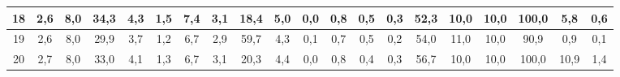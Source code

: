 \begin{sidewaystable}[]
\begin{tabular}{|c|c|c|c|c|c|c|c|c|c|c|c|c|c|c|c|c|c|c|c|}
    18 & 2,6                                              & 8,0                                              & 34,3                                             & 4,3                                              & 1,5                                              & 7,4                                              & 3,1                                              & 18,4                                             & 5,0                                              & 0,0                                              & 0,8                                              & 0,5                                              & 0,3                                              & 52,3                                            & 10,0                                            & 10,0                                            & 100,0                                           & 5,8                                             & 0,6                                             \\ \hline
    19 & 2,6                                              & 8,0                                              & 29,9                                             & 3,7                                              & 1,2                                              & 6,7                                              & 2,9                                              & 59,7                                             & 4,3                                              & 0,1                                              & 0,7                                              & 0,5                                              & 0,2                                              & 54,0                                            & 11,0                                            & 10,0                                            & 90,9                                            & 0,9                                             & 0,1                                             \\ \hline
    20 & 2,7                                              & 8,0                                              & 33,0                                             & 4,1                                              & 1,3                                              & 6,7                                              & 3,1                                              & 20,3                                             & 4,4                                              & 0,0                                              & 0,8                                              & 0,4                                              & 0,3                                              & 56,7                                            & 10,0                                            & 10,0                                            & 100,0                                           & 10,9                                            & 1,4                                             \\ \hline

\end{tabular}
\end{sidewaystable}
